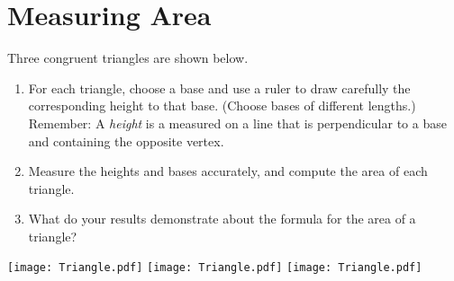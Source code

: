 \newpage

\section{Measuring Area}

\begin{prob}
Three congruent triangles are shown below.   
\begin{enumerate}
\item For each triangle, choose a base and use a ruler to draw carefully the corresponding height to that base.  (Choose bases of different lengths.)  Remember:  A \emph{height} is a measured on a line that is perpendicular to a base and containing the opposite vertex. 
\item Measure the heights and bases accurately, and compute the area of each triangle.  
\item What do your results demonstrate about the formula for the area of a triangle?  
\end{enumerate}

\begin{fullwidth}
\texttt{[image: Triangle.pdf]}
\texttt{[image: Triangle.pdf]}
\texttt{[image: Triangle.pdf]}
\end{fullwidth}

\end{prob}
